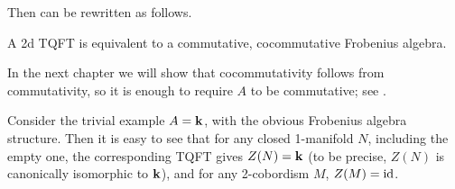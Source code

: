 Then  can be rewritten as follows.
\begin{theorem}\label{t:2d-classification2}
  A 2d TQFT is equivalent to a commutative, cocommutative Frobenius algebra.
\end{theorem}
In the next chapter we will show that cocommutativity follows from
commutativity, so it is enough to require $A$ to be commutative; see
.


\begin{example}\label{x:trivial-2d}
  Consider the trivial example $A=\mathbf{k}$, with the obvious Frobenius algebra
structure. Then it is easy to see that for any closed 1-manifold $N$, including
the empty one, the corresponding TQFT gives $Z(N)=\mathbf{k}$ (to be precise,
$Z(N)$ is canonically isomorphic to $\mathbf{k}$), and for any 2-cobordism $M$,
$Z(M)=\operatorname{id}$.
\end{example}
